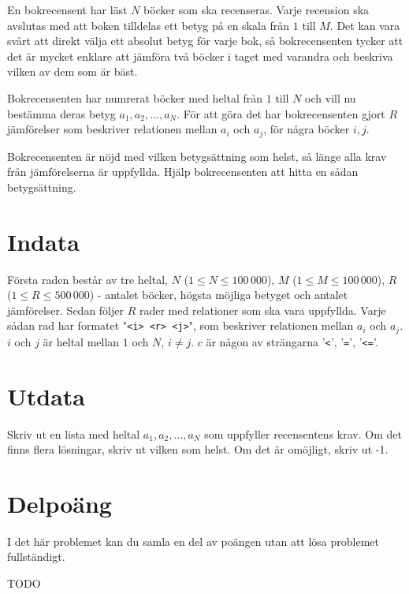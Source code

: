 
En bokrecensent har läst $N$ böcker som ska recenseras. Varje recension ska
avslutas med att boken tilldelas ett betyg på en skala från $1$ till $M$. Det kan
vara svårt att direkt välja ett absolut betyg för varje bok, så
bokrecensenten tycker att det är mycket enklare att jämföra två böcker i
taget med varandra och beskriva vilken av dem som är bäst.

Bokrecensenten har numrerat böcker med heltal från $1$ till $N$ och vill nu
bestämma deras betyg $a_1, a_2, \dots , a_N$. För att göra det har
bokrecensenten gjort $R$ jämförelser som beskriver relationen mellan $a_i$ och
$a_j$, för några böcker $i, j$.

Bokrecensenten är nöjd med vilken betygsättning som helst, så länge alla krav
från jämförelserna är uppfyllda. Hjälp bokrecensenten att hitta en sådan
betygsättning.

\section*{Indata}

Första raden består av tre heltal, $N$ ($1 \leq N \leq 100\,000$), 
$M$ ($1 \leq M \leq 100\,000$),
$R$ ($1 \leq R \leq 500\,000$) - antalet böcker, högsta möjliga
betyget och antalet jämförelser. Sedan följer $R$ rader med relationer som ska
vara
uppfyllda. Varje sådan rad har formatet "\texttt{<i> <r> <j>}",
som beskriver relationen mellan $a_i$ och $a_j$. $i$ och $j$ är heltal mellan
$1$ och $N$, $i \neq j$. $c$ är någon av strängarna '\texttt{<}', '\texttt{=}',
'\texttt{<=}'.

\section*{Utdata}

Skriv ut en lista med heltal $a_1, a_2, \ldots , a_N$ som uppfyller recensentens
krav. Om det finns flera lösningar, skriv ut vilken som helst. Om det är
omöjligt, skriv ut -1.

\section*{Delpoäng}

I det här problemet kan du samla en del av poängen utan att
lösa problemet fullständigt.

TODO
